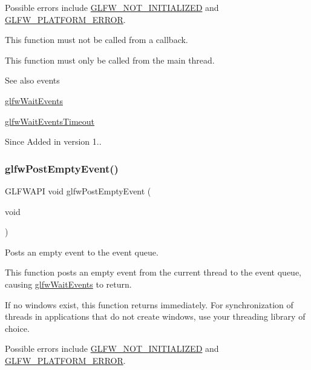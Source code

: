 Possible errors include \hyperlink{group__errors_ga2374ee02c177f12e1fa76ff3ed15e14a}{G\+L\+F\+W\+\_\+\+N\+O\+T\+\_\+\+I\+N\+I\+T\+I\+A\+L\+I\+Z\+ED} and \hyperlink{group__errors_gad44162d78100ea5e87cdd38426b8c7a1}{G\+L\+F\+W\+\_\+\+P\+L\+A\+T\+F\+O\+R\+M\+\_\+\+E\+R\+R\+OR}.

This function must not be called from a callback.

This function must only be called from the main thread.

\begin{DoxySeeAlso}{See also}
events 

\hyperlink{group__window_ga6e042d05823c11e11c7339b81a237738}{glfw\+Wait\+Events} 

\hyperlink{group__window_ga05223a0a4c5e50f10f289e60398153aa}{glfw\+Wait\+Events\+Timeout}
\end{DoxySeeAlso}
\begin{DoxySince}{Since}
Added in version 1.. 
\end{DoxySince}
\mbox{\label{group__window_gad6f6b997278c91c43b35970eb9713d7e}} 
\subsubsection{\texorpdfstring{glfw\+Post\+Empty\+Event()}{glfwPostEmptyEvent()}}
{\footnotesize\ttfamily G\+L\+F\+W\+A\+PI void glfw\+Post\+Empty\+Event (\begin{DoxyParamCaption}\item[{void}]{ }\end{DoxyParamCaption})}



Posts an empty event to the event queue. 

This function posts an empty event from the current thread to the event queue, causing \hyperlink{group__window_ga6e042d05823c11e11c7339b81a237738}{glfw\+Wait\+Events} to return.

If no windows exist, this function returns immediately. For synchronization of threads in applications that do not create windows, use your threading library of choice.

Possible errors include \hyperlink{group__errors_ga2374ee02c177f12e1fa76ff3ed15e14a}{G\+L\+F\+W\+\_\+\+N\+O\+T\+\_\+\+I\+N\+I\+T\+I\+A\+L\+I\+Z\+ED} and \hyperlink{group__errors_gad44162d78100ea5e87cdd38426b8c7a1}{G\+L\+F\+W\+\_\+\+P\+L\+A\+T\+F\+O\+R\+M\+\_\+\+E\+R\+R\+OR}.

